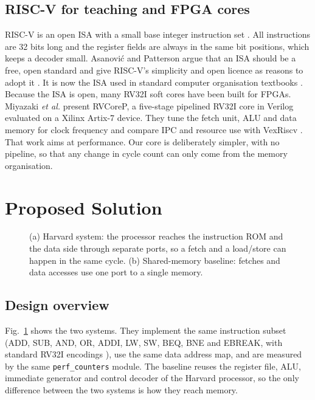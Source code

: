 \documentclass[conference]{IEEEtran}
\newcommand{\sig}[1]{\texttt{#1}}
\begin{document}
\subsection{RISC-V for teaching and FPGA cores}
RISC-V is an open ISA with a small base integer instruction set \cite{riscv_spec}. All
instructions are 32 bits long and the register fields are always in the same bit positions,
which keeps a decoder small. Asanovi\'{c} and Patterson argue that an ISA should be a free, open
standard and give RISC-V's simplicity and open licence as reasons to adopt it
\cite{asanovic2014}. It is now the ISA used in standard computer organisation textbooks
\cite{ph_riscv,harris_riscv}. Because the ISA is open, many RV32I soft cores have been built for
FPGAs. Miyazaki \emph{et al.} present RVCoreP, a five-stage pipelined RV32I core in Verilog
evaluated on a Xilinx Artix-7 device. They tune the fetch unit, ALU and data memory for clock
frequency and compare IPC and resource use with VexRiscv \cite{miyazaki2020}. That work aims at
performance. Our core is deliberately simpler, with no pipeline, so that any change in cycle count
can only come from the memory organisation.

\section{Proposed Solution}
\begin{figure}[t]
  \centering
  \resizebox{0.86\textwidth}{!}{}
  \caption{(a) Harvard system: the processor reaches the instruction ROM and the data side
  through separate ports, so a fetch and a load/store can happen in the same cycle. (b)
  Shared-memory baseline: fetches and data accesses use one port to a single memory.}
  \label{fig:block}
\end{figure}

\subsection{Design overview}
Fig.~\ref{fig:block} shows the two systems. They implement the same instruction subset
(ADD, SUB, AND, OR, ADDI, LW, SW, BEQ, BNE and EBREAK, with standard RV32I encodings
\cite{riscv_spec}), use the same data address map, and are measured by the same
\sig{perf\_counters} module. The baseline reuses the register file, ALU, immediate generator
and control decoder of the Harvard processor, so the only difference between the two systems is
how they reach memory.
\end{document}
